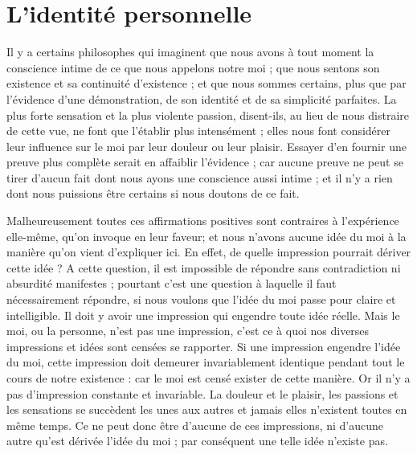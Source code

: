 
\section{L'identité personnelle}
Il y a certains philosophes qui imaginent que nous
avons à tout moment la conscience intime de ce que nous
appelons notre moi ; que nous sentons son existence et sa
continuité d’existence ; et que nous sommes certains,
plus que par l’évidence d’une démonstration, de son identité
et de sa simplicité parfaites. La plus forte sensation
et la plus violente passion, disent-ils, au lieu de nous
distraire de cette vue, ne font que l’établir plus intensément ;
elles nous font considérer leur influence sur le moi
par leur douleur ou leur plaisir. Essayer d’en fournir une
preuve plus complète serait en affaiblir l’évidence ; car
aucune preuve ne peut se tirer d’aucun fait dont nous
ayons une conscience aussi intime ; et il n’y a rien dont
nous puissions être certains si nous doutons de ce fait.

Malheureusement toutes ces affirmations positives sont
contraires à l’expérience elle-même, qu’on invoque en
leur faveur; et nous n’avons aucune idée du moi à la
manière qu’on vient d’expliquer ici. En effet, de quelle
impression pourrait dériver cette idée ? A cette question,
il est impossible de répondre sans contradiction ni absurdité
manifestes ; pourtant c’est une question à laquelle
il faut nécessairement répondre, si nous voulons que l’idée
du moi passe pour claire et intelligible. Il doit y avoir une
impression qui engendre toute idée réelle. Mais le moi,
ou la personne, n’est pas une impression, c’est ce à quoi
nos diverses impressions et idées sont censées se rapporter.
Si une impression engendre l’idée du moi, cette impression
doit demeurer invariablement identique pendant tout le
cours de notre existence : car le moi est censé exister de
cette manière. Or il n’y a pas d’impression constante et
invariable. La douleur et le plaisir, les passions et les
sensations se succèdent les unes aux autres et jamais elles
n’existent toutes en même temps. Ce ne peut donc être
d’aucune de ces impressions, ni d’aucune autre qu’est
dérivée l’idée du moi ; par conséquent une telle idée n’existe
pas.

